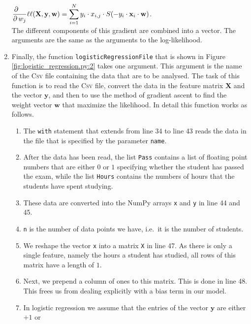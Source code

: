\begin{enumerate}
      \\[0.2cm]
      \hspace*{1.3cm}
      $\displaystyle \frac{\partial\quad}{\partial\, w_j}\ell\ell(\mathbf{X},\mathbf{y},\mathbf{w}) =
        \displaystyle\sum\limits_{i=1}^N y_i \cdot x_{i,j} \cdot  S(-y_i \cdot \mathbf{x}_i \cdot \mathbf{w})
      $.
      \\[0.2cm]
      The different components of this gradient are combined into a vector.
      The arguments are the same as the arguments to the log-likelihood.
\item Finally, the function \texttt{logisticRegressionFile} that is shown in Figure
      \ref{fig:logistic_regression.py:2} takes one argument.  This argument
      is the name of the \textsc{Csv} file containing the data that are to be analysed.  
      The task of this function is to read the \textsc{Csv} file, convert the data in the feature matrix
      $\mathbf{X}$ and the vector $\mathbf{y}$, and then to use the method of gradient ascent to find the weight vector
      $\mathbf{w}$ that maximize the likelihood.  In detail this function works as follows.
      \begin{enumerate}
      \item The \texttt{with} statement that extends from line 34 to line 43 reads the data in the file that
            is specified by the parameter \texttt{name}.
      \item After the data has been read, the list \texttt{Pass} contains a list of floating point numbers that
            are either $0$ or $1$ specifying whether the student has passed the exam, while the list
            \texttt{Hours} contains the numbers of hours that the students have spent studying.
      \item These data are converted into the NumPy arrays \texttt{x} and \texttt{y} in line 44 and 45.
      \item \texttt{n} is the number of data points we have, i.e.~it is the number of students.
      \item We reshape the vector \texttt{x} into a matrix \texttt{X} in line 47.
            As there is only a single feature, namely the hours a student has studied, all rows of this matrix
            have a length of $1$. 
      \item Next, we prepend a column of ones to this matrix.  This is done in line 48.
            This frees us from dealing explicitly with a bias term in our model.      
      \item In logistic regression we assume that the entries of the vector $\mathbf{y}$ are either $+1$ or

\end{enumerate}
\end{enumerate}
